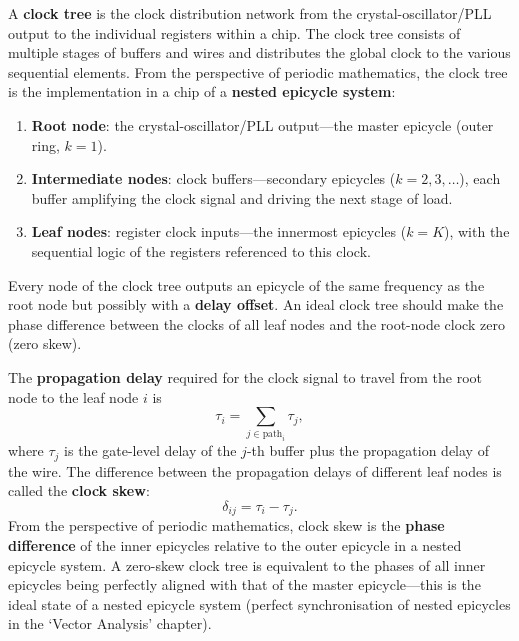 \begin{definition}\label{def:clock_tree}
A \textbf{clock tree} is the clock distribution network from the crystal-oscillator/PLL output to the individual registers within a chip. The clock tree consists of multiple stages of buffers and wires and distributes the global clock to the various sequential elements. From the perspective of periodic mathematics, the clock tree is the implementation in a chip of a \textbf{nested epicycle system}:
\begin{enumerate}[label=(\roman*)]
    \item \textbf{Root node}: the crystal-oscillator/PLL output---the master epicycle (outer ring, $k=1$).
    \item \textbf{Intermediate nodes}: clock buffers---secondary epicycles ($k=2, 3, \dots$), each buffer amplifying the clock signal and driving the next stage of load.
    \item \textbf{Leaf nodes}: register clock inputs---the innermost epicycles ($k=K$), with the sequential logic of the registers referenced to this clock.
\end{enumerate}
Every node of the clock tree outputs an epicycle of the same frequency as the root node but possibly with a \textbf{delay offset}. An ideal clock tree should make the phase difference between the clocks of all leaf nodes and the root-node clock zero (zero skew).
\end{definition}

\begin{definition}\label{def:clock_skew}
The \textbf{propagation delay} required for the clock signal to travel from the root node to the leaf node $i$ is
\[
\tau_i = \sum_{j \in \text{path}_i} \tau_j,
\]
where $\tau_j$ is the gate-level delay of the $j$-th buffer plus the propagation delay of the wire. The difference between the propagation delays of different leaf nodes is called the \textbf{clock skew}:
\[
\delta_{ij} = \tau_i - \tau_j.
\]
From the perspective of periodic mathematics, clock skew is the \textbf{phase difference} of the inner epicycles relative to the outer epicycle in a nested epicycle system. A zero-skew clock tree is equivalent to the phases of all inner epicycles being perfectly aligned with that of the master epicycle---this is the ideal state of a nested epicycle system (perfect synchronisation of nested epicycles in the `Vector Analysis' chapter).
\end{definition}

